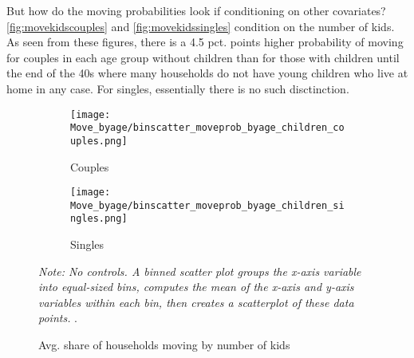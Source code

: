 But how do the moving probabilities look if conditioning on other covariates? \autoref{fig:movekidscouples} and \autoref{fig:movekidssingles} condition on the number of kids. As seen from these figures, there is a 4.5 pct. points higher probability of moving for couples in each age group without children than for those with children until the end of the 40s where many households do not have young children who live at home in any case. For singles, essentially there is no such disctinction. 
\begin{figure}
\centering
\begin{minipage}{\textwidth}
\begin{subfigure}{.50\textwidth}
  \centering
  \texttt{[image: Move\_byage/binscatter\_moveprob\_byage\_children\_couples.png]}
  \caption{\footnotesize{Couples}}
  \label{fig:movekidscouples}
\end{subfigure}
\begin{subfigure}{.50\textwidth}
  \centering
  \texttt{[image: Move\_byage/binscatter\_moveprob\_byage\_children\_singles.png]}
  \caption{\footnotesize{Singles}}
  \label{fig:movekidssingles}
\end{subfigure}
{\tiny \emph{Note: No controls. A binned scatter plot groups the x-axis variable into equal-sized bins, computes the mean of the x-axis and y-axis variables within each bin, then creates a scatterplot of these data points.} .\par}
\end{minipage}
\caption{Avg. share of households moving by number of kids}
\label{fig:movekids}
\end{figure}
%


